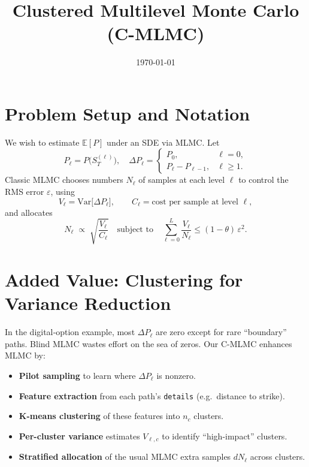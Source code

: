 \documentclass{article}
\title{Clustered Multilevel Monte Carlo (C-MLMC)}
\date{\today}
\begin{document}
\maketitle

\section{Problem Setup and Notation}
We wish to estimate \(\mathbb{E}[P]\) under an SDE via MLMC.  Let
\[
P_\ell = P\bigl(S_T^{(\ell)}\bigr),\quad
\Delta P_\ell = 
\begin{cases}
P_0, & \ell=0,\\
P_\ell - P_{\ell-1}, & \ell\ge1.
\end{cases}
\]
Classic MLMC chooses numbers \(N_\ell\) of samples at each level \(\ell\) to control the RMS error \(\varepsilon\), using
\[
V_\ell = \mathrm{Var}\bigl[\Delta P_\ell\bigr],\qquad
C_\ell = \text{cost per sample at level }\ell,
\]
and allocates
\[
N_\ell
\;\propto\;
\sqrt{\frac{V_\ell}{C_\ell}}
\quad\text{subject to}\quad
\sum_{\ell=0}^L\frac{V_\ell}{N_\ell}\le (1-\theta)\,\varepsilon^2.
\]

\section{Added Value: Clustering for Variance Reduction}
In the digital‐option example, most \(\Delta P_\ell\) are zero except for rare “boundary” paths.  Blind MLMC wastes effort on the sea of zeros.  Our C-MLMC enhances MLMC by:
\begin{itemize}
  \item \textbf{Pilot sampling} to learn where \(\Delta P_\ell\) is nonzero.
  \item \textbf{Feature extraction} from each path’s \texttt{details} (e.g.\ distance to strike).
  \item \textbf{K-means clustering} of these features into \(n_c\) clusters.
  \item \textbf{Per-cluster variance} estimates \(V_{\ell,c}\) to identify “high-impact” clusters.
  \item \textbf{Stratified allocation} of the usual MLMC extra samples \(dN_\ell\) across clusters.
\end{itemize}
\end{document}
